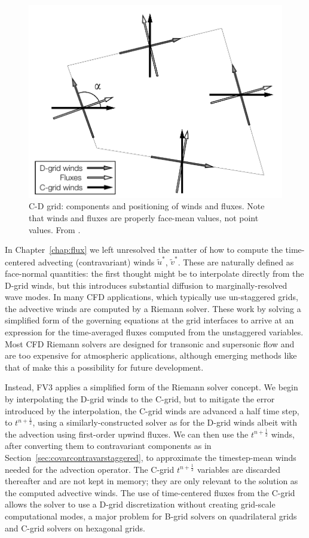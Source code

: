 \documentclass[10pt,letterpaper,margin=1in]{memoir}
\newcommand{\half}{\frac{1}{2}}
\begin{document}
\begin{figure}[t] %
   \centering
   \includegraphics[scale=0.75]{CDgrid.pdf} 
   \caption{C-D grid: components and positioning of winds and fluxes. Note that winds and fluxes are properly face-mean values, not point values. From \citet{HL13}.}
   \label{fig:CDgrid}
\end{figure}

In Chapter~\ref{chap:flux} we left unresolved the matter of how to compute the time-centered advecting (contravariant) winds $\widetilde{u}^*$, $\widetilde{v}^*$. These are naturally defined as face-normal quantities: the first thought might be to interpolate directly from the D-grid winds, but this introduces substantial diffusion to marginally-resolved wave modes. In many CFD applications, which typically use un-staggered grids, the advective winds are computed by a Riemann solver. These work by solving a simplified form of the governing equations at the grid interfaces to arrive at an expression for the time-averaged fluxes computed from the unstaggered variables. Most CFD Riemann solvers are designed for transonic and supersonic flow and are too expensive for atmospheric applications, although emerging methods like that of \citet{XChen2021} make this a possibility for future development.

Instead, FV3 applies a simplified form of the Riemann solver concept. We begin by interpolating the D-grid winds to the C-grid, but to mitigate the error introduced by the interpolation, the C-grid winds are advanced a half time step, to $t^{n+\half}$, using a similarly-constructed solver as for the D-grid winds albeit with the advection using first-order upwind fluxes. We can then use the $t^{n+\half}$ winds, after converting them to contravariant components as in Section~\ref{sec:covarcontravarstaggered}, to approximate the timestep-mean winds needed for the advection operator. The C-grid $t^{n+\half}$  variables are discarded thereafter and are not kept in memory; they are only relevant to the solution as the computed advective winds. 
The use of time-centered fluxes from the C-grid allows the solver to use a D-grid discretization without creating grid-scale computational modes, a major problem for B-grid solvers on quadrilateral grids and C-grid solvers on hexagonal grids.
\end{document}
